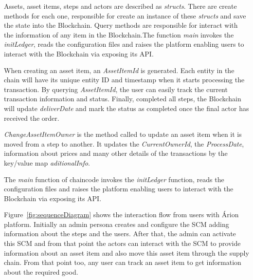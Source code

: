 Assets, asset items, steps and actors are described as \textit{structs}. There are create methods for each one,  responsible for create an instance of these \textit{structs} and save the state into the Blockchain. Query methods are responsible for interact with the information of any item in the Blockchain.The function \textit{main} invokes the \textit{initLedger}, reads the configuration files and raises the platform enabling users to interact with the Blockchain via exposing its API. 

When creating an asset item, an \textit{AssetItemId} is generated. Each entity in the chain will have its unique entity ID and timestamp when it starts processing the transaction. By querying \textit{AssetItemId}, the user can easily track the current transaction information and status. Finally, completed all steps, the Blockchain will update \textit{deliverDate} and mark the status as completed once the final actor has received the order. 

\textit{ChangeAssetItemOwner} is the method called to update an asset item when it is moved from a step to another. It updates the \textit{CurrentOwnerId}, the \textit{ProcessDate}, information about prices and many other details of the transactions by the key/value map \textit{  aditionalInfo}. 


The \textit{main} function of chaincode invokes the \textit{initLedger} function, reads the configuration files and raises the platform enabling users to interact with the Blockchain via exposing its API.

Figure~\ref{fig:sequenceDiagram} shows the interaction flow from users with Árion platform. Initially an admin persona creates and configure the SCM adding information about the steps and the users. After that, the admin can activate this SCM and from that point the actors can interact with the SCM to provide information about an asset item and also move this asset item through the supply chain. From that point too, any user can track an asset item to get information about the required good.
